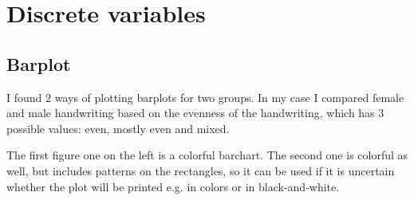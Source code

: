 \documentclass[a4paper]{article}
\begin{document}
	
	
	\section{Discrete variables}
	\subsection{Barplot}
	I found 2 ways of plotting barplots for two  groups. In my case I compared female and male handwriting based on the evenness of the handwriting, which has 3 possible values: even, mostly even and mixed. 
	
	The first figure one on the left is a colorful barchart. The second one is colorful as well, but includes patterns on the rectangles, so it can be used if it is uncertain whether the plot will be printed e.g. in colors or in black-and-white. 
	
\end{document}
